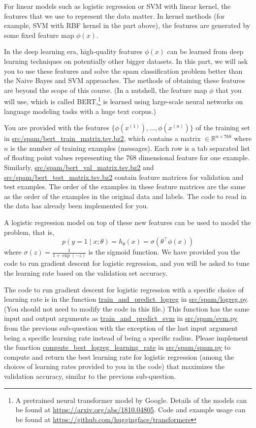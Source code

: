 \item {}
For linear models such as logistic regression or SVM with linear kernel, the features that we use to represent the data matter. In kernel methods (for example, SVM with RBF kernel in the part above), the features are generated by some fixed feature map $\phi(x)$. 

In the deep learning era, high-quality features $\phi(x)$ can be learned from deep learning techniques on potentially other bigger datasets. In this part, we will ask you to use these features and solve the spam classification problem better than the Naive Bayes and SVM approaches. The methods of obtaining these features are beyond the scope of this course. (In a nutshell, the feature map $\phi$ that you will use, which is called BERT,\footnote{A pretrained neural transformer model by Google. Details of the models can be found
	at \url{https://arxiv.org/abs/1810.04805}. Code and example usage can be found at 
	\url{https://github.com/huggingface/transformers}} is learned using large-scale neural networks on language modeling tasks with a huge text corpus.)

You are provided with the features $\{\phi(x^{(1)}), \dots, \phi(x^{(n)})\}$ of the training set in \url{src/spam/bert_train_matrix.tsv.bz2}, which contains a matrix $\in \mathbb{R}^{n\times 768}$ where $n$ is the number of training examples (messages). Each row is a tab separated list of floating point values representing the 768 dimensional feature for one example.  Similarly, \url{src/spam/bert_val_matrix.tsv.bz2} and \url{src/spam/bert_test_matrix.tsv.bz2} contain feature matrices for validation and test examples. The order of the examples in these feature matrices are the same as the order of the examples in the original data and labels. The code to read in the data has already been implemented for you.

A logistic regression model on top of these new features can be used to model the problem, that is,
\begin{equation}
	p(y=1 \mid x; \theta) = h_\theta(x) = \sigma(\theta^\top \phi(x))
	\label{eq:logreg_bert}
\end{equation}
where $\sigma(z)=\frac{1}{1 + \exp(-z)}$ is the sigmoid function. We have provided you the code to run gradient descent for logistic regression, and you will be asked to tune the learning rate based on the validation set accuracy.

The code to run gradient descent for logistic regression with a specific choice of learning rate is in the function \url{train_and_predict_logreg} in \url{src/spam/logreg.py}. (You should not need to modify the code in this file.) This function has 
the same input and output arguments as \url{train_and_predict_svm} in \url{src/spam/svm.py} from the previous sub-question with the exception of the last input argument being a specific learning rate instead of being a specific radius.
Please implement the function \url{compute_best_logreg_learning_rate} in \url{src/spam/spam.py} to compute and return the best learning rate for logistic regression (among the choices of learning rates provided to you in the code) that maximizes the validation accuracy, similar to the previous sub-question.

